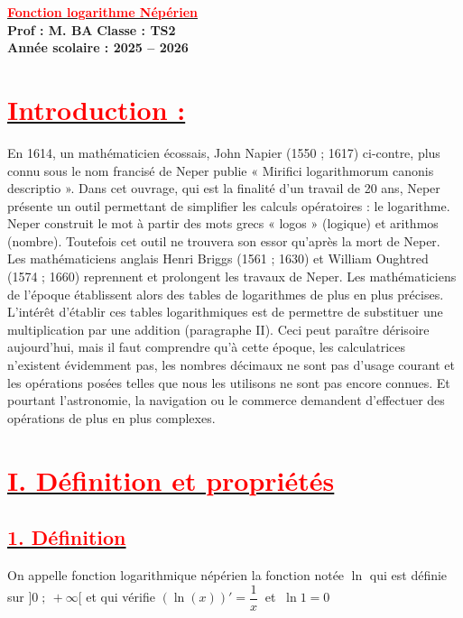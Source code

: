 \documentclass[12pt,a4paper]{article}
\begin{document}
\begin{center}
    \Large\textbf{\underline{\textcolor{red}{Fonction logarithme Népérien}}}\\[-0.1cm]
    \normalsize\textbf{Prof : M. BA} \hfill \textbf{Classe : TS2}\\[-0.1cm]
    \textbf{Année scolaire : 2025 -- 2026}
\end{center}


\section*{\underline{\textbf{\textcolor{red}{Introduction :}}}}

En 1614, un mathématicien écossais, John Napier (1550 ; 1617) ci-contre, plus connu sous le nom francisé de Neper publie « Mirifici logarithmorum canonis descriptio ».
Dans cet ouvrage, qui est la finalité d’un travail de 20 ans, Neper présente un outil permettant de simplifier les calculs opératoires : le logarithme.
Neper construit le mot à partir des mots grecs « logos » (logique) et arithmos (nombre).
Toutefois cet outil ne trouvera son essor qu’après la mort de Neper. Les mathématiciens anglais Henri Briggs (1561 ; 1630) et William Oughtred (1574 ; 1660) reprennent et prolongent les travaux de Neper.
Les mathématiciens de l’époque établissent alors des tables de logarithmes de plus en plus précises.
L’intérêt d’établir ces tables logarithmiques est de permettre de substituer une multiplication par une addition (paragraphe II). Ceci peut paraître dérisoire aujourd’hui, mais il faut comprendre qu’à cette époque, les calculatrices n’existent évidemment pas, les nombres décimaux ne sont pas d’usage courant et les opérations posées telles que nous les utilisons ne sont pas encore connues. Et pourtant l'astronomie, la navigation ou le commerce demandent d’effectuer des opérations de plus en plus complexes.

\section*{\underline{\textbf{\textcolor{red}{I. Définition et propriétés}}}}
\subsection*{\underline{\textbf{\textcolor{red}{1. Définition}}}}
On appelle fonction logarithmique népérien la fonction notée $\ln$ qui est définie sur $]0\;;\ +\infty[$ et qui vérifie $(\ln (x))'=\dfrac{1}{x}\ $ et $\ \ln 1=0$
\end{document}
